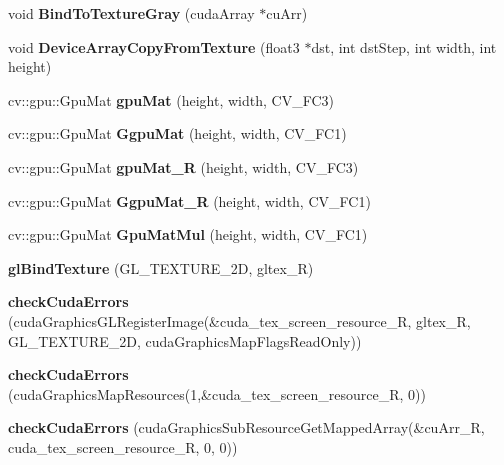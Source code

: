 \begin{DoxyCompactItemize}
\item 
void {\bfseries Bind\+To\+Texture\+Gray} (cuda\+Array $\ast$cu\+Arr)\label{likelihood_8cpp_a9bd1a50894d1115d05c57f87add73c42}

\item 
void {\bfseries Device\+Array\+Copy\+From\+Texture} (float3 $\ast$dst, int dst\+Step, int width, int height)\label{likelihood_8cpp_aed2b9af36a5d83fb5af9a3e0216a9bda}

\item 
cv\+::gpu\+::\+Gpu\+Mat {\bfseries gpu\+Mat} (height, width, C\+V\+\_\+F\+C3)\label{likelihood_8cpp_a9e11d91678df63408922f36ab79e1ced}

\item 
cv\+::gpu\+::\+Gpu\+Mat {\bfseries Ggpu\+Mat} (height, width, C\+V\+\_\+F\+C1)\label{likelihood_8cpp_afb29da2e21ca335d2a631cf195a5e80c}

\item 
cv\+::gpu\+::\+Gpu\+Mat {\bfseries gpu\+Mat\+\_\+R} (height, width, C\+V\+\_\+F\+C3)\label{likelihood_8cpp_aba302d62e85ef4e6728a6fe42cd15590}

\item 
cv\+::gpu\+::\+Gpu\+Mat {\bfseries Ggpu\+Mat\+\_\+R} (height, width, C\+V\+\_\+F\+C1)\label{likelihood_8cpp_a90bbd15ab1dd67bb336fea136c8d408e}

\item 
cv\+::gpu\+::\+Gpu\+Mat {\bfseries Gpu\+Mat\+Mul} (height, width, C\+V\+\_\+F\+C1)\label{likelihood_8cpp_a1961759f7e191502e163ba50304b876c}

\item 
{\bfseries gl\+Bind\+Texture} (G\+L\+\_\+\+T\+E\+X\+T\+U\+R\+E\+\_\+2D, gltex\+\_\+R)\label{likelihood_8cpp_a5de2c2b7029c53b9e622cacdaacf94b7}

\item 
{\bfseries check\+Cuda\+Errors} (cuda\+Graphics\+G\+L\+Register\+Image(\&cuda\+\_\+tex\+\_\+screen\+\_\+resource\+\_\+R, gltex\+\_\+R, G\+L\+\_\+\+T\+E\+X\+T\+U\+R\+E\+\_\+2D, cuda\+Graphics\+Map\+Flags\+Read\+Only))\label{likelihood_8cpp_a306197df655aaeb8213e99b155fde626}

\item 
{\bfseries check\+Cuda\+Errors} (cuda\+Graphics\+Map\+Resources(1,\&cuda\+\_\+tex\+\_\+screen\+\_\+resource\+\_\+R, 0))\label{likelihood_8cpp_ac68ed96bf30aeacb13b1a800a10d4060}

\item 
{\bfseries check\+Cuda\+Errors} (cuda\+Graphics\+Sub\+Resource\+Get\+Mapped\+Array(\&cu\+Arr\+\_\+R, cuda\+\_\+tex\+\_\+screen\+\_\+resource\+\_\+R, 0, 0))\label{likelihood_8cpp_aaa713469a9bf20fc53000101a5ab47c6}


\end{DoxyCompactItemize}
